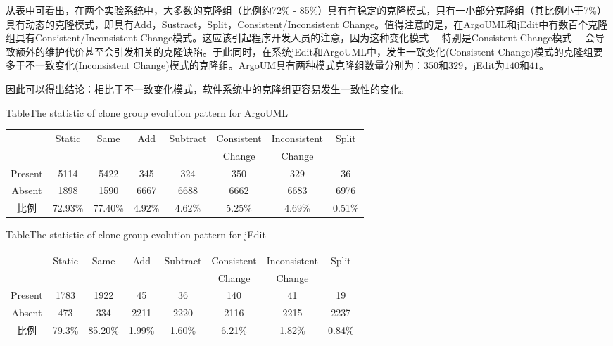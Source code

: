 从表中可看出，在两个实验系统中，大多数的克隆组（比例约72\% - 85\%）具有有稳定的克隆模式，只有一小部分克隆组（其比例小于7\%）具有动态的克隆模式，即具有Add，Sustract，Split，Consistent/Inconsistent Change。值得注意的是，在ArgoUML和jEdit中有数百个克隆组具有Consistent/Inconsistent Change模式。这应该引起程序开发人员的注意，因为这种变化模式----特别是Consistent Change模式----会导致额外的维护代价甚至会引发相关的克隆缺陷。于此同时，在系统jEdit和ArgoUML中，发生一致变化(Consistent Change)模式的克隆组要多于不一致变化(Inconsistent Change)模式的克隆组。ArgoUM具有两种模式克隆组数量分别为：$350$和$329$，jEdit为$140$和$41$。

因此可以得出结论：相比于不一致变化模式，软件系统中的克隆组更容易发生一致性的变化。

\begin{table}[htbp]
{Table$\!$}{The statistic of clone group evolution pattern for ArgoUML}
\vspace{0.5em}
\centering
\wuhao
\begin{tabular}{cccccccc}
\toprule[1.5pt]
~&\multirow{2}{*}{Static}&\multirow{2}{*}{Same}&\multirow{2}{*}{Add}&\multirow{2}{*}{Subtract}&Consistent&Inconsistent&\multirow{2}{*}{Split}\\ 
~&&&&&Change&Change&\\ 
\midrule[1pt]
Present	&5114	&5422	&345	&324	&350	&329	&36\\ 
Absent	&1898	&1590	&6667	&6688	&6662	&6683	&6976\\ 
比例	&72.93\%	&77.40\%	&4.92\%	&4.62\%	&5.25\%	&4.69\%	&0.51\%\\ 
\bottomrule[1.5pt]
\end{tabular}
\end{table}

\begin{table}[htbp]
{Table$\!$}{The statistic of clone group evolution pattern for jEdit}
\vspace{0.5em}
\centering
\wuhao
\begin{tabular}{cccccccc}
\toprule[1.5pt]
~&\multirow{2}{*}{Static}&\multirow{2}{*}{Same}&\multirow{2}{*}{Add}&\multirow{2}{*}{Subtract}&Consistent&Inconsistent&\multirow{2}{*}{Split}\\ 
~&&&&&Change&Change&\\ 
\midrule[1pt]
Present	&1783	&1922	&45	&36	&140	&41	&19\\ 
Absent	&473	&334	&2211	&2220	&2116	&2215	&2237\\ 
比例	&79.3\%	&85.20\%	&1.99\%	&1.60\%	&6.21\%	&1.82\%	&0.84\%\\ 
\bottomrule[1.5pt]
\end{tabular}
\end{table}

